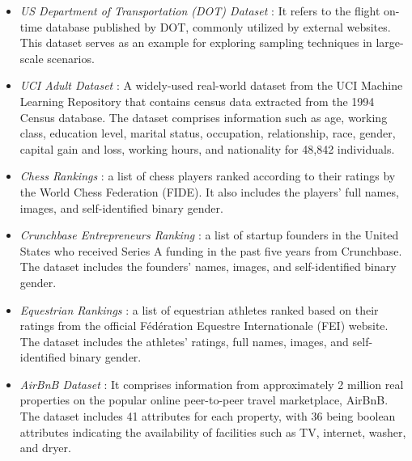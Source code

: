 \begin{itemize}
    
    \item \emph{US Department of Transportation (DOT) Dataset} \cite{dot}: It refers to the flight on-time database published by DOT, commonly utilized by external websites. This dataset serves as an example for exploring sampling techniques in large-scale scenarios.
    
    
    \item \emph{UCI Adult Dataset} \cite{lichman2013}: A widely-used real-world dataset from the UCI Machine Learning Repository that contains census data extracted from the 1994 Census database.
    The dataset comprises information such as age, working class, education level, marital status, occupation, relationship, race, gender, capital gain and loss, working hours, and nationality for 48,842 individuals.
    
    
    \item \emph{Chess Rankings} \cite{fide}: a list of chess players ranked according to their ratings by the World Chess Federation (FIDE). It also includes the players' full names, images, and self-identified binary gender.
    

    \item \emph{Crunchbase Entrepreneurs Ranking} \cite{crunchbase}: a list of startup founders in the United States who received Series A funding in the past five years from Crunchbase. The dataset includes the founders' names, images, and self-identified binary gender.

    \item \emph{Equestrian Rankings} \cite{fei}: a list of equestrian athletes ranked based on their ratings from the official Fédération Equestre Internationale (FEI) website. The dataset includes the athletes' ratings, full names, images, and self-identified binary gender.
    
    \item \emph{AirBnB Dataset} \cite{airbnb}: It comprises information from approximately 2 million real properties on the popular online peer-to-peer travel marketplace, AirBnB. The dataset includes 41 attributes for each property, with 36 being boolean attributes indicating the availability of facilities such as TV, internet, washer, and dryer.    
\end{itemize}


\newpage

